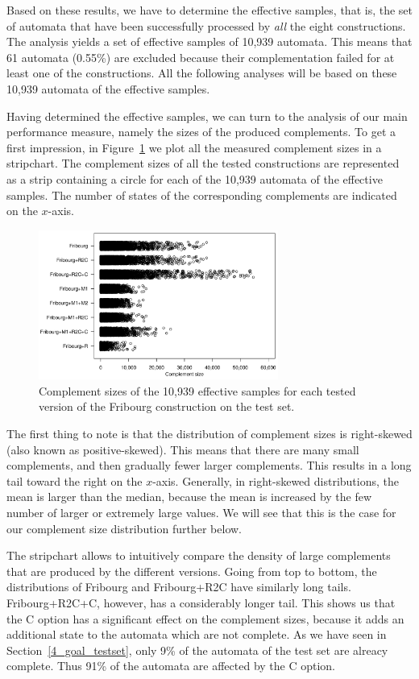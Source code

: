 Based on these results, we have to determine the effective samples, that is, the set of automata that have been successfully processed by \textit{all} the eight constructions. The analysis yields a set of effective samples of 10,939 automata. This means that 61 automata (0.55\%) are excluded because their complementation failed for at least one of the constructions. All the following analyses will be based on these 10,939 automata of the effective samples.

Having determined the effective samples, we can turn to the analysis of our main performance measure, namely the sizes of the produced complements. To get a first impression, in Figure~\ref{i.g.stripchart} we plot all the measured complement sizes in a stripchart. The complement sizes of all the tested constructions are represented as a strip containing a circle for each of the 10,939 automata of the effective samples. The number of states of the corresponding complements are indicated on the $x$-axis.

\begin{figure}[ht]
\centering
\includegraphics[width=0.7\textwidth]{figures/r/internal/goal/s.stripchart.pdf}
\caption{Complement sizes of the 10,939 effective samples for each tested version of the Fribourg construction on the \goal{} test set.}
\label{i.g.stripchart}
\end{figure}

The first thing to note is that the distribution of complement sizes is right-skewed (also known as positive-skewed). This means that there are many small complements, and then gradually fewer larger complements. This results in a long tail toward the right  on the $x$-axis. Generally, in right-skewed distributions, the mean is larger than the median, because the mean is increased by the few number of larger or extremely large values. We will see that this is the case for our complement size distribution further below.

The stripchart allows to intuitively compare the density of large complements that are produced by the different versions. Going from top to bottom, the distributions of Fribourg and Fribourg+R2C have similarly long tails. Fribourg+R2C+C, however, has a considerably longer tail. This shows us that the C option has a significant effect on the complement sizes, because it adds an additional state to the automata which are not complete. As we have seen in Section~\ref{4_goal_testset}, only 9\% of the automata of the \goal{} test set are alreacy complete. Thus 91\% of the automata are affected by the C option.

